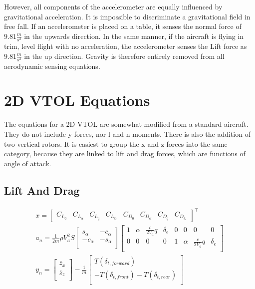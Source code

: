 However, all components of the accelerometer are equally influenced by gravitational acceleration.
It is impossible to discriminate a gravitational field in free fall. 
If an accelerometer is placed on a table, it senses the normal force of $9.81 \frac{m}{s^2}$ in the upwards direction. 
In the same manner, if the aircraft is flying in trim, level flight with no acceleration, the accelerometer senses the Lift force as $9.81 \frac{m}{s^2}$ in the up direction. 
Gravity is therefore entirely removed from all aerodynamic sensing equations.

\section{2D VTOL Equations}

The equations for a 2D VTOL are somewhat modified from a standard aircraft. 
They do not include y forces, nor l and n moments. 
There is also the addition of two vertical rotors. 
It is easiest to group the x and z forces into the same category, because they are linked to lift and drag forces, which are functions of angle of attack.

\subsection{Lift And Drag}

\begin{align}
    x =
    \begin{bmatrix}
        C_{L_0} & C_{L_\alpha} & C_{L_q} & C_{L_{\delta_e}} & C_{D_0} & C_{D_\alpha} & C_{D_q} & C_{D_{\delta_e}}
    \end{bmatrix}^\top\\
    a_n = \frac{1}{2m} \rho V_a^2 S
    \begin{bmatrix}
        s_\alpha & -c_{\alpha}\\
        -c_{\alpha} & -s_{\alpha}\\
    \end{bmatrix}
    \begin{bmatrix}
        1 & \alpha & \frac{c}{2 V_a} q & \delta_e & 0 & 0 & 0 & 0\\
        0 & 0 & 0 & 0 & 1 & \alpha & \frac{c}{2 V_a} q & \delta_e\\
    \end{bmatrix}\\
    y_n =
    \begin{bmatrix}
        \ddot{z_x}\\
        \ddot{z_z}\\
    \end{bmatrix}
    - \frac{1}{m}
    \begin{bmatrix}
        T(\delta_{t,forward})\\
        -T(\delta_{t,front}) - T(\delta_{t,rear})\\
    \end{bmatrix}
\end{align}

